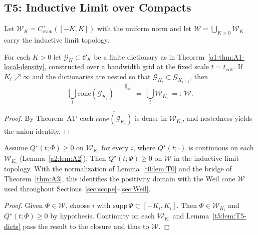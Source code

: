 \subsection{T5: Inductive Limit over Compacts}
Let $\mathcal W_K=C^+_{\mathrm{even}}([-K,K])$ with the uniform norm and let $\mathcal W=\bigcup_{K>0}\mathcal W_K$ carry the inductive limit topology.

\begin{lemma}\label{t5:lem:T5-dicts}
For each $K>0$ let $\mathcal G_K\subset\mathcal C_K$ be a finite dictionary as in Theorem~\ref{a1:thm:A1-local-density}, constructed over a bandwidth grid at the fixed scale $t=t_{\mathrm{crit}}$. If $K_i\nearrow\infty$ and the dictionaries are nested so that $\mathcal G_{K_i}\subset\mathcal G_{K_{i+1}}$, then
\begin{equation}\label{eq:T5_compact_limit_lemmas-formula}
\bigcup\limits_i \overline{\mathrm{cone}(\mathcal G_{K_i})}^{\,\|\cdot\|_\infty}\ =\ \bigcup\limits_i \mathcal W_{K_i}\ =:\ \mathcal W.
\end{equation}
\end{lemma}
\begin{proof}
By Theorem~A1$'$ each $\overline{\mathrm{cone}(\mathcal G_{K_i})}$ is dense in $\mathcal W_{K_i}$, and nestedness yields the union identity.
\end{proof}

\begin{theorem}\label{t5:thm:T5-transfer}\label{lem:T5-transfer}
Assume $Q^\star(t;\Phi)\ge0$ on $\mathcal W_{K_i}$ for every $i$, where $Q^\star(t;\cdot)$ is continuous on each $\mathcal W_{K_i}$ (Lemma~\ref{a2:lem:A2}). Then $Q^\star(t;\Phi)\ge0$ on $\mathcal W$ in the inductive limit topology. With the normalization of Lemma~\ref{t0:lem:T0} and the bridge of Theorem~\ref{thm:A3}, this identifies the positivity domain with the Weil cone $\mathcal W$ used throughout Sections~\ref{sec:scope}--\ref{sec:Weil}.
\end{theorem}
\begin{proof}
Given $\Phi\in\mathcal W$, choose $i$ with $\mathrm{supp}\,\Phi\subset[-K_i,K_i]$. Then $\Phi\in\mathcal W_{K_i}$ and $Q^\star(t;\Phi)\ge0$ by hypothesis. Continuity on each $\mathcal W_{K_i}$ and Lemma~\ref{t5:lem:T5-dicts} pass the result to the closure and thus to $\mathcal W$.
\end{proof}

